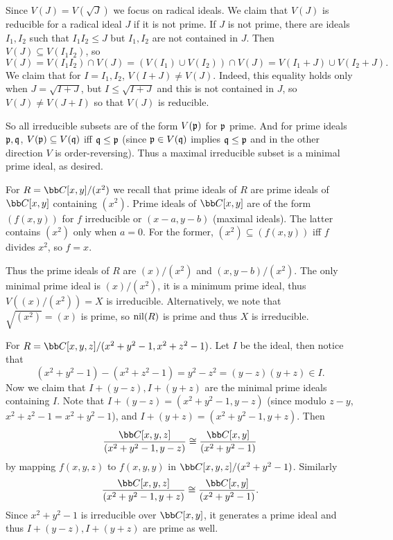         Since $V(J)=V(\sqrt J)$ we focus on radical ideals.
        We claim that $V(J)$ is reducible for a radical ideal $J$ if it is not prime.
        If $J$ is not prime, there are ideals $I_1,I_2$ such that $I_1I_2\leq J$ but $I_1,I_2$ are not contained in $J$.
        Then $V(J)\subseteq V(I_1I_2)$, so
        $$ V(J) = V(I_1I_2)\cap V(J) = (V(I_1) \cup V(I_2))\cap V(J) = V(I_1+J) \cup V(I_2+J) . $$
        We claim that for $I=I_1,I_2$, $V(I+J)\neq V(J)$.
        Indeed, this equality holds only when $J=\sqrt{I+J}$, but $I\leq\sqrt{I+J}$ and this is not contained in $J$, so $V(J)\neq V(J+I)$ so that $V(J)$ is reducible.

        So all irreducible subsets are of the form $V({{\frak p}})$ for ${{\frak p}}$ prime.
        And for prime ideals ${{\frak p}},{{\frak q}}$, $V({{\frak p}})\subseteq V({{\frak q}})$ iff ${{\frak q}}\leq{{\frak p}}$ (since ${{\frak p}}\in V({{\frak q}})$ implies ${{\frak q}}\leq{{\frak p}}$ and in the other direction $V$ is order-reversing).
        Thus a maximal irreducible subset is a minimal prime ideal, as desired.

        \item For $R=\bC[x,y]/(x^2)$ we recall that prime ideals of $R$ are prime ideals of $\bC[x,y]$ containing $(x^2)$.
        Prime ideals of $\bC[x,y]$ are of the form $(f(x,y))$ for $f$ irreducible or $(x-a,y-b)$ (maximal ideals).
        The latter contains $(x^2)$ only when $a=0$.
        For the former, $(x^2)\subseteq(f(x,y))$ iff $f$ divides $x^2$, so $f=x$.

        Thus the prime ideals of $R$ are $(x)/(x^2)$ and $(x,y-b)/(x^2)$.
        The only minimal prime ideal is $(x)/(x^2)$, it is a minimum prime ideal, thus $V((x)/(x^2))=X$ is irreducible.
        Alternatively, we note that $\sqrt{(x^2)}=(x)$ is prime, so ${\rm nil}(R)$ is prime and thus $X$ is irreducible.

        For $R=\bC[x,y,z]/(x^2+y^2-1,x^2+z^2-1)$.
        Let $I$ be the ideal, then notice that
        $$ (x^2 + y^2 - 1) - (x^2 + z^2 - 1) = y^2 - z^2 = (y-z)(y+z) \in I . $$
        Now we claim that $I+(y-z),I+(y+z)$ are the minimal prime ideals containing $I$.
        Note that $I+(y-z)=(x^2+y^2-1,y-z)$ (since modulo $z-y$, $x^2+z^2-1=x^2+y^2-1$), and $I+(y+z)=(x^2+y^2-1,y+z)$.
        Then
        $$ \frac{\bC[x,y,z]}{(x^2+y^2-1,y-z)} \cong \frac{\bC[x,y]}{(x^2+y^2-1)} $$
        by mapping $f(x,y,z)$ to $f(x,y,y)$ in $\bC[x,y,z]/(x^2+y^2-1)$.
        Similarly
        $$ \frac{\bC[x,y,z]}{(x^2+y^2-1,y+z)} \cong \frac{\bC[x,y]}{(x^2+y^2-1)} . $$
        Since $x^2+y^2-1$ is irreducible over $\bC[x,y]$, it generates a prime ideal and thus $I+(y-z),I+(y+z)$ are prime as well.

